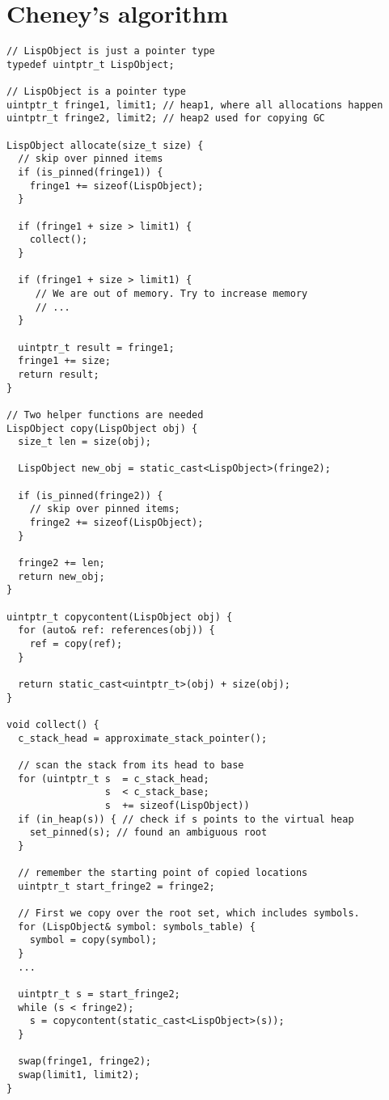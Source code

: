 \section{Cheney's algorithm}
\label{sec:cheneycode}

\begin{code}
\begin{verbatim}
// LispObject is just a pointer type
typedef uintptr_t LispObject;

// LispObject is a pointer type
uintptr_t fringe1, limit1; // heap1, where all allocations happen
uintptr_t fringe2, limit2; // heap2 used for copying GC

LispObject allocate(size_t size) {
  // skip over pinned items
  if (is_pinned(fringe1)) {
    fringe1 += sizeof(LispObject);
  }

  if (fringe1 + size > limit1) {
    collect();
  }

  if (fringe1 + size > limit1) {
     // We are out of memory. Try to increase memory
     // ...
  }

  uintptr_t result = fringe1;
  fringe1 += size;
  return result;
}

// Two helper functions are needed
LispObject copy(LispObject obj) {
  size_t len = size(obj);

  LispObject new_obj = static_cast<LispObject>(fringe2);

  if (is_pinned(fringe2)) {
    // skip over pinned items;
    fringe2 += sizeof(LispObject);
  }

  fringe2 += len;
  return new_obj;
}

uintptr_t copycontent(LispObject obj) {
  for (auto& ref: references(obj)) {
    ref = copy(ref);
  }

  return static_cast<uintptr_t>(obj) + size(obj);
}

void collect() {
  c_stack_head = approximate_stack_pointer();

  // scan the stack from its head to base
  for (uintptr_t s  = c_stack_head;
                 s  < c_stack_base;
                 s  += sizeof(LispObject))
  if (in_heap(s)) { // check if s points to the virtual heap
    set_pinned(s); // found an ambiguous root
  }

  // remember the starting point of copied locations
  uintptr_t start_fringe2 = fringe2;

  // First we copy over the root set, which includes symbols.
  for (LispObject& symbol: symbols_table) {
    symbol = copy(symbol);
  }
  ...

  uintptr_t s = start_fringe2;
  while (s < fringe2);
    s = copycontent(static_cast<LispObject>(s));
  }

  swap(fringe1, fringe2);
  swap(limit1, limit2);
}
\end{verbatim}
\end{code}

